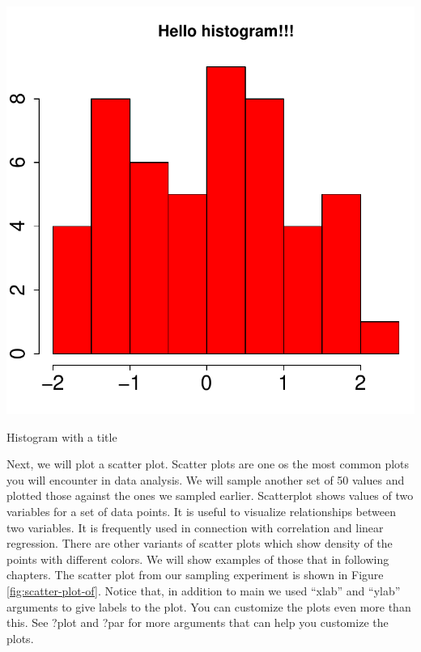 \documentclass[english,nohyper]{tufte-book}\usepackage[]{graphicx}\usepackage[]{color}
\newenvironment{knitrout}{}{} %
\begin{document}
\begin{marginfigure}
\begin{knitrout}
\color{fgcolor}

{\centering \includegraphics[width=\linewidth]{figure/graphics-pdf-hist2} 

}



\end{knitrout}



\caption{Histogram with a title\label{mar:hist_title}}
\end{marginfigure}


Next, we will plot a scatter plot. Scatter plots are one os the most
common plots you will encounter in data analysis. We will sample another
set of 50 values and plotted those against the ones we sampled earlier.
Scatterplot shows values of two variables for a set of data points.
It is useful to visualize relationships between two variables. It
is frequently used in connection with correlation and linear regression.
There are other variants of scatter plots which show density of the
points with different colors. We will show examples of those that
in following chapters. The scatter plot from our sampling experiment
is shown in Figure \ref{fig:scatter-plot-of}. Notice that, in addition
to main we used ``xlab'' and ``ylab'' arguments to give labels
to the plot. You can customize the plots even more than this. See
?plot and ?par for more arguments that can help you customize the
plots.
\end{document}

